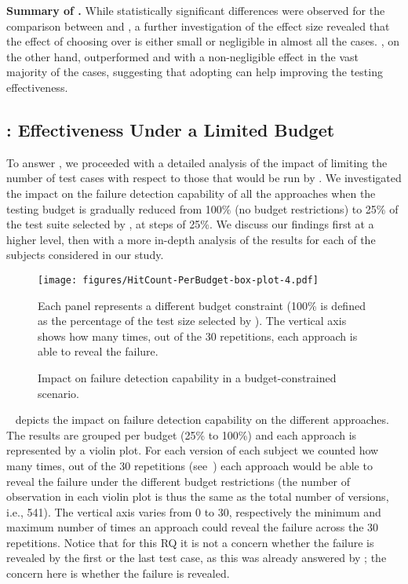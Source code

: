 \begin{tcolorbox}%
\textbf{Summary of .} While statistically significant differences were observed for the comparison between \ek and \fs, a further investigation of the effect size revealed that the effect of choosing \ek over \fs is either small or negligible in almost all the cases.
\fz, on the other hand, outperformed \ek and \fs with a non-negligible effect in the vast majority of the cases, suggesting that adopting \fz can help improving the testing effectiveness.
\end{tcolorbox}


\subsection{: Effectiveness Under a Limited Budget}
\label{subsec:rq2}

To answer , we proceeded with a detailed analysis of the impact of limiting the number of test cases with respect to those that would be run by \ek. 
We investigated the impact on the failure detection capability of all the approaches 
when the testing budget is gradually reduced from 100\% (no budget restrictions) 
to 25\% of the test suite selected by \ek, at steps of 25\%.
%
We discuss our findings first at a higher level, then with a more in-depth analysis of the results for each of the subjects considered in our study.

\begin{figure*}[h]
  \centering
  \texttt{[image: figures/HitCount-PerBudget-box-plot-4.pdf]}
  \begin{flushleft}
	\footnotesize
	Each panel represents a different budget constraint (100\% is defined as the percentage of the test size selected by \ek).
	The vertical axis shows how many times, out of the 30 repetitions, each approach is able to reveal the failure.
  \end{flushleft}
  \caption{Impact on failure detection capability in a budget-constrained scenario.}
  \label{fig:perbudget}
\end{figure*}

~ depicts the impact on failure detection capability on the different approaches.
The results are grouped per budget 
(25\% to 100\%) 
and each approach is represented by a violin plot.
For each version of each subject 
we counted how many times, out of the 30 repetitions (see~)
each approach would be able to reveal the failure under the different budget restrictions 
(the number of observation in each violin plot is thus the same as the total number of versions, i.e., 541).
The vertical axis varies from 0 to 30, respectively the minimum and maximum number of times an approach could reveal the failure across the 30 repetitions.
Notice that for this RQ it is not a concern whether the failure is revealed by the first or the last test case, 
as this was already answered by ; the  concern here is whether the failure is revealed.

